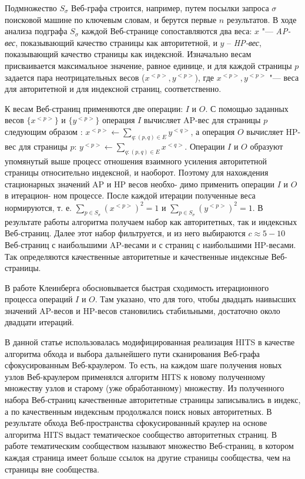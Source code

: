 Подмножество \(S_\sigma\) Веб-графа строится, например, путем посылки запроса \(\sigma\) поисковой машине по ключевым словам, и берутся первые \(n\) результатов. В ходе анализа подграфа \(S_\sigma\) каждой Веб-странице сопоставляются два веса: \(x\) "--- \textit{AP-вес}, показывающий качество страницы как авторитетной, и \(y\) – \textit{HP-вес}, показывающий качество страницы как индексной. Изначально весам присваивается максимальное значение, равное единице, и для каждой страницы \(p\) задается пара неотрицательных весов (\(x^{<p>}, y^{<p>}\)), где \(x^{<p>}, y^{<p>}\) "--- веса для авторитетной и для индексной страниц, соответственно.

К весам Веб-страниц применяются две операции: \(I\) и \(O\). С помощью заданных весов \(\{x^{<p>}\}\) и \(\{y^{<p>}\}\) операция \(I\) вычисляет AP-вес для страницы \(p\) следующим образом \cite{Kleinberg}: \(x^{<p>} \leftarrow \sum_{q: (p, q) \in E} y^{<q>}\), а операция \(O\) вычисляет HP-вес для страницы \(p\): \(y^{<p>} \leftarrow \sum_{q: (p, q) \in E} x^{<q>}\). Операции \(I\) и \(O\) образуют упомянутый выше процесс отношения взаимного усиления авторитетной страницы относительно индексной, и наоборот. Поэтому для нахождения стационарных значений AP и HP весов необхо- димо применить операции \(I\) и \(O\) в итерацион- ном процессе. После каждой итерации полученные веса нормируются, т. е. \(\sum_{p \in S_\sigma} (x^{<p>})^2 = 1\) и  \(\sum_{p \in S_\sigma} (y^{<p>})^2 = 1\). В результате работы алгоритма получаем набор как авторитетных, так и индексных Веб-страниц. Далее этот набор фильтруется, и из него выбираются \(c \approx 5-10\) Веб-страниц с наибольшими AP-весами и с страниц с наибольшими HP-весами. Так определяются качественные авторитетные и качественные индексные Веб-страницы.

В работе Клеинберга \cite{Kleinberg} обосновывается быстрая сходимость итерационного процесса операций \(I\) и \(O\). Там указано, что для того, чтобы двадцать наивысших значений AP-весов и HP-весов становились стабильными, достаточно около двадцати итераций.

В данной статье использовалась модифицированная реализация HITS в качестве алгоритма обхода и выбора дальнейшего пути сканирования Веб-графа сфокусированным Веб-краулером. То есть, на каждом шаге получения новых узлов Веб-краулером применялся алгоритм HITS к новому полученному множеству узлов и старому (уже обработанному) множеству. Из полученного набора Веб-страниц качественные авторитетные страницы записывались в индекс, а по качественным индексным продолжался поиск новых авторитетных. В результате обхода Веб-пространства сфокусированный краулер на основе алгоритма HITS выдаст тематическое сообщество авторитетных страниц. В работе \cite{GibsonKleinbergRaghavan} тематическим сообществом называют множество Веб-страниц, в котором каждая страница имеет больше ссылок на другие страницы сообщества, чем на страницы вне сообщества.

